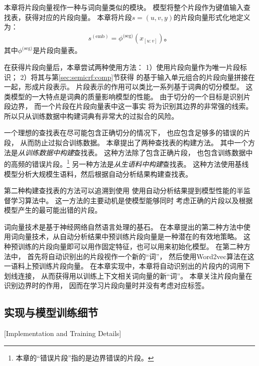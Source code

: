 本章将片段向量视作一种与词向量类似的模块。
模型将整个片段作为键值输入查找表，获得对应的片段向量。
本章将片段$s=(u, v, y)$的片段向量形式化地定义为：
\begin{align}
s^{(\text{emb})} = \phi^{\text{(seg)}}(x_{[u:v]})\text{。}
\end{align}
其中$\phi^{\text{(seg)}}$是片段向量表。

在获得片段向量后，本章尝试两种使用方法：
1）使用片段向量作为唯一片段标识；
2）将其与第\ref{sec:semicrf:comp}节获得
的基于输入单元组合的片段向量拼接在一起，形成片段表示。
片段表示的作用可以类比一系列基于词典的切分模型。
这类模型的一大特点是词典的质量影响模型的性能。
由于切分的一个目标是识别片段边界，
而一个片段在片段向量表中这一事实
将为识别其边界的非常强的线索。
所以只从训练数据中构建词典有非常大的过拟合的风险。

一个理想的查找表在尽可能包含正确切分的情况下，
也应包含足够多的错误的片段，
从而防止过拟合训练数据。
本章提出了两种查找表的构建方法。
其中一个方法是\textit{从训练数据中构建}查找表。
这种方法除了包含正确片段，
也包含训练数据中的高频的错误片段。\footnote{本章的``错误片段''指的是边界错误的片段。}
另一种方法是\textit{从生语料中构建}查找表。
这种方法使用基线模型分析大规模生语料，然后根据自动分析结果构建查找表。

第二种构建查找表的方法可以追溯到使用
使用自动分析结果提到模型性能的半监督学习算法中\cite{chen-EtAl:2009:EMNLP,wang-EtAl:2011:IJCNLP-2011}。
这一方法的主要动机是使模型能够同时
考虑正确的片段以及根据模型产生的最可能出错的片段。

词向量技术是基于神经网络自然语言处理的基石。
在本章提出的第二种方法中使用词向量技术，从自动分析结果中预训练片段向量是一种潜在的有效地策略。
这种预训练的片段向量即可以用作固定特征，也可以用来初始化模型。
在第二种方法中，
首先将自动识别出的片段视作一个新的``词''，
然后使用Word2vec算法在这一语料上预训练片段向量。
在本章实现中，本章将自动识别出的片段内的词用下划线连接，
从而获得用以训练上下文相关词向量的新``词''。
本章关注片段向量在识别边界时的作用，
因而在学习片段向量时并没有考虑对应标签。

\subsection{实现与模型训练细节}[Implementation and Training Details]

